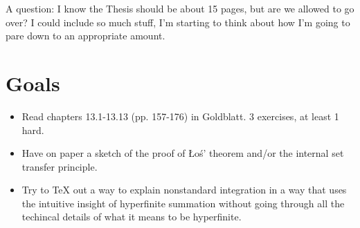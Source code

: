 \documentclass{article}
\begin{document}
A question: I know the Thesis should be about 15 pages, but are we allowed to go over? I could include so much stuff, I'm starting to think about how I'm going to pare down to an appropriate amount.

\section*{Goals}
\begin{itemize}
    \item Read chapters 13.1-13.13 (pp. 157-176) in Goldblatt. 3 exercises, at least 1 hard.
    \item Have on paper a sketch of the proof of \L o\'s' theorem and/or the internal set transfer principle.
    \item Try to TeX out a way to explain nonstandard integration in a way that uses the intuitive insight of hyperfinite summation without going through all the techincal details of what it means to be hyperfinite.
\end{itemize}

\nocite{goldblatt1998}
\printbibliography[title={Things I'm Looking At}]
\end{document}
